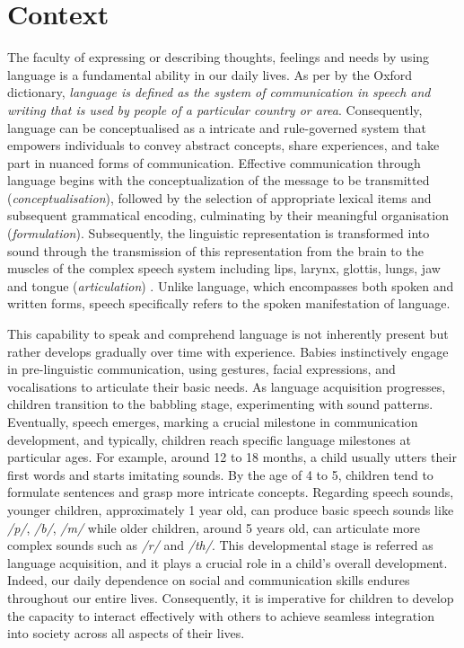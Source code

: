 \cleardoublepage
\label{chapter:1}

\section{Context}
The faculty of expressing or describing thoughts, feelings and needs by using language is a fundamental ability in our daily lives. As per by the Oxford dictionary,  \textit{language is defined as the system of communication in speech and writing that is used by people of a particular country or area}. Consequently, language can be conceptualised as a intricate and rule-governed system that empowers individuals to convey abstract concepts, share experiences, and take part in nuanced forms of communication. Effective communication through language begins with the conceptualization of the message to be transmitted (\textit{conceptualisation}), followed by the selection of appropriate lexical items and subsequent grammatical encoding, culminating by their meaningful organisation (\textit{formulation}). Subsequently, the linguistic representation is transformed into sound through the transmission of this representation from the brain to the muscles of the complex speech system including lips, larynx, glottis, lungs, jaw and tongue (\textit{articulation}) \cite{levelt1993speaking}. Unlike language, which encompasses both spoken and written forms, speech specifically refers to the spoken manifestation of language.


This capability to speak and comprehend language is not inherently present but rather develops gradually over time with experience. Babies  instinctively engage in pre-linguistic communication, using gestures, facial expressions, and vocalisations to articulate their basic needs. As language acquisition progresses, children transition to the babbling stage, experimenting with sound patterns. Eventually, speech emerges, marking a crucial milestone in communication development, and typically, children reach specific language milestones at particular ages. For example, around 12 to 18 months, a child usually utters their first words and starts imitating sounds. By the age of 4 to 5, children tend to formulate sentences and grasp more intricate concepts. Regarding speech sounds, younger children, approximately 1 year old, can produce basic speech sounds like \textit{/p/}, \textit{/b/}, \textit{/m/} while older children, around 5 years old, can articulate more complex sounds such as \textit{/r/} and \textit{/th/}. This developmental stage is referred as language acquisition, and it plays a crucial role in a child's overall development. Indeed, our daily dependence on social and communication skills endures throughout our entire lives. Consequently, it is imperative for children to develop the capacity to interact effectively with others to achieve seamless integration into society across all aspects of their lives.

